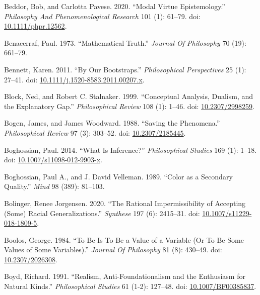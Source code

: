 \documentclass[
  10pt,
  letterpaper,
  DIV=11,
  numbers=noendperiod,
  twoside]{scrartcl}
\newlength{\cslhangindent}
\newenvironment{CSLReferences}[2] %
 {\begin{list}{}{%
  \setlength{\itemindent}{0pt}
  \setlength{\leftmargin}{0pt}
  \setlength{\parsep}{0pt}
  \ifodd #1
   \setlength{\leftmargin}{\cslhangindent}
   \setlength{\itemindent}{-1\cslhangindent}
  \fi
  \setlength{\itemsep}{#2\baselineskip}}}
 {\end{list}}
\begin{document}
\begin{CSLReferences}{1}{0}
Beddor, Bob, and Carlotta Pavese. 2020. {``Modal Virtue Epistemology.''}
\emph{Philosophy And Phenomenological Research} 101 (1): 61--79. doi:
\href{https://doi.org/10.1111/phpr.12562}{10.1111/phpr.12562}.

Benacerraf, Paul. 1973. {``Mathematical Truth.''} \emph{Journal Of
Philosophy} 70 (19): 661--79.

Bennett, Karen. 2011. {``By Our Bootstraps.''} \emph{Philosophical
Perspectives} 25 (1): 27--41. doi:
\href{https://doi.org/10.1111/j.1520-8583.2011.00207.x}{10.1111/j.1520-8583.2011.00207.x}.

Block, Ned, and Robert C. Stalnaker. 1999. {``Conceptual Analysis,
Dualism, and the Explanatory Gap.''} \emph{Philosophical Review} 108
(1): 1--46. doi:
\href{https://doi.org/10.2307/2998259}{10.2307/2998259}.

Bogen, James, and James Woodward. 1988. {``Saving the Phenomena.''}
\emph{Philosophical Review} 97 (3): 303--52. doi:
\href{https://doi.org/10.2307/2185445}{10.2307/2185445}.

Boghossian, Paul. 2014. {``What Is Inference?''} \emph{Philosophical
Studies} 169 (1): 1--18. doi:
\href{https://doi.org/10.1007/s11098-012-9903-x}{10.1007/s11098-012-9903-x}.

Boghossian, Paul A., and J. David Velleman. 1989. {``Color as a
Secondary Quality.''} \emph{Mind} 98 (389): 81--103.

Bolinger, Renee Jorgensen. 2020. {``The Rational Impermissibility of
Accepting (Some) Racial Generalizations.''} \emph{Synthese} 197 (6):
2415--31. doi:
\href{https://doi.org/10.1007/s11229-018-1809-5}{10.1007/s11229-018-1809-5}.

Boolos, George. 1984. {``To Be Is To Be a Value of a Variable (Or To Be
Some Values of Some Variables).''} \emph{Journal Of Philosophy} 81 (8):
430--49. doi: \href{https://doi.org/10.2307/2026308}{10.2307/2026308}.

Boyd, Richard. 1991. {``Realism, Anti-Foundationalism and the Enthusiasm
for Natural Kinds.''} \emph{Philosophical Studies} 61 (1-2): 127--48.
doi: \href{https://doi.org/10.1007/BF00385837}{10.1007/BF00385837}.


\end{CSLReferences}
\end{document}
